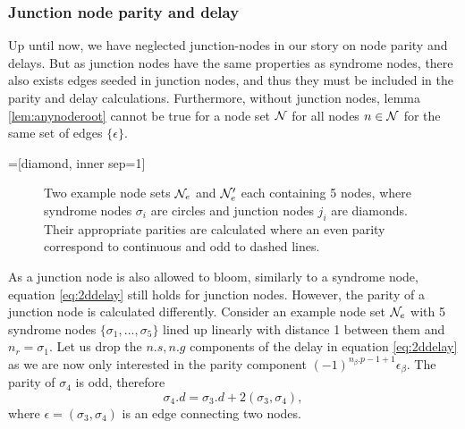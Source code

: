 \subsubsection{Junction node parity and delay}

Up until now, we have neglected junction-nodes in our story on node parity and delays. But as junction nodes have the same properties as syndrome nodes, there also exists edges seeded in junction nodes, and thus they must be included in the parity and delay calculations. Furthermore, without junction nodes, lemma \ref{lem:anynoderoot} cannot be true for a node set $\mathcal{N}$ for all nodes $n \in \mathcal{N}$ for the same set of edges $\{\epsilon\}$.

=[diamond, inner sep=1]
\begin{figure}
  \centering
  \caption{Two example node sets $\mathcal{N}_e$ and $\mathcal{N}_e'$ each containing 5 nodes, where syndrome nodes $\sigma_i$ are circles and junction nodes $j_i$ are diamonds. Their appropriate parities are calculated where an even parity correspond to continuous and odd to dashed lines. }\label{fig:junctionparity}
\end{figure}
As a junction node is also allowed to bloom, similarly to a syndrome node, equation \ref{eq:2ddelay} still holds for junction nodes. However, the parity of a junction node is calculated differently. Consider an example node set $\mathcal{N}_e$ with 5 syndrome nodes $\{\sigma_1,...,\sigma_5\}$ lined up linearly with distance 1 between them and $n_r = \sigma_1$. Let us drop the $n.s, n.g$ components of the delay in equation \ref{eq:2ddelay} as we are now only interested in the parity component $(-1)^{n_\beta.p-1+1}\epsilon_\beta$. The parity of $\sigma_4$ is odd, therefore
\begin{equation*}
  \sigma_4.d = \sigma_3.d + 2(\sigma_3, \sigma_4),
\end{equation*}
where $\epsilon = (\sigma_3, \sigma_4)$ is an edge connecting two nodes.

